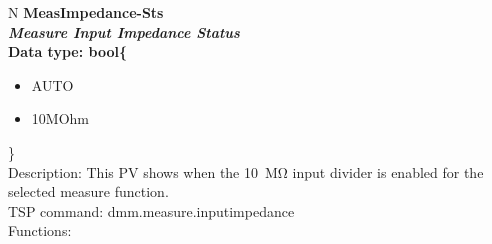 \documentclass[openany]{article}
\begin{document}
		\begin{tabular}{N}
			\hline
			\bfseries MeasImpedance-Sts\label{pv:measimpedance-sts} \\ \hline
			\emph{Measure Input Impedance Status} \\
			Data type: bool\{\begin{itemize}[noitemsep]
				\small
				\item[] AUTO
				\item[] 10MOhm
			\end{itemize}\} \\
			Description: This PV shows when the \SI{10}{\mega\ohm} input divider is enabled for the selected measure function. \\
			TSP command: dmm.measure.inputimpedance \\
			Functions: \\
			\arrayrulecolor{\FuncTableBorderColor}

		\end{tabular}
\end{document}
